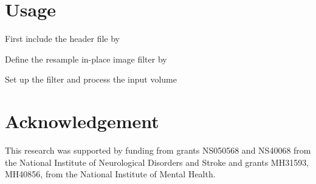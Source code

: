 \documentclass{InsightArticle}
\begin{document}
\section{Usage}

First include the header file by
\begin{center}

\end{center}

Define the resample in-place image filter by
\begin{center}

\end{center}

Set up the filter and process the input volume
\begin{center}

\end{center}

\section{Acknowledgement}

This research was supported by funding from grants NS050568 and NS40068 from the National Institute of Neurological Disorders and Stroke and grants MH31593, MH40856, from the National Institute of Mental Health.

%
%



\end{document}

